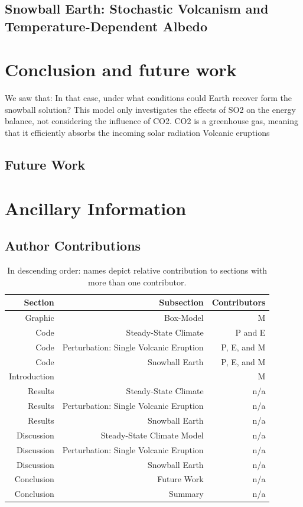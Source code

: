 \documentclass[12pt]{article}
\begin{document}
\subsection{Snowball Earth: Stochastic Volcanism and Temperature-Dependent Albedo}
\label{sec:snowballearth}

\section{Conclusion and future work}

We saw that:
In that case, under what conditions could Earth recover form the snowball solution?
This model only investigates the effects of SO2 on the energy balance, not considering
the influence of CO2. CO2 is a greenhouse gas, meaning that it efficiently absorbs the
incoming solar radiation Volcanic eruptions 
\subsection{Future Work}

\section{Ancillary Information}
\subsection{Author Contributions}

\begin{table}[H]
    \centering
    \begin{tabular}{rrr}
    Section & Subsection & Contributors \\
    \hline
    Graphic & Box-Model & M  \\
    Code & Steady-State Climate & P and E \\
    Code & Perturbation: Single Volcanic Eruption & P, E, and M \\
    Code & Snowball Earth & P, E, and M \\
    Introduction &  & M \\
    Results & Steady-State Climate & n/a \\
    Results & Perturbation: Single Volcanic Eruption & n/a \\
    Results & Snowball Earth & n/a\\
    Discussion & Steady-State Climate Model & n/a \\
    Discussion & Perturbation: Single Volcanic Eruption & n/a \\
    Discussion & Snowball Earth & n/a\\
    Conclusion & Future Work & n/a \\
    Conclusion & Summary & n/a \\
    \end{tabular}
    \caption{
        In descending order: names depict relative contribution to
        sections with more than one contributor.
    }
    \label{tab:contributions}
\end{table}
\end{document}
